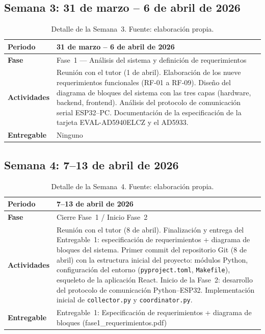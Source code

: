 \documentclass[11pt,a4paper,spanish]{book}
\begin{document}
\subsection{Semana 3: 31 de marzo -- 6 de abril de 2026}

\begin{table}[ht]
\centering
\begin{tabular}{p{3cm} p{10cm}}
\hline\hline
\textbf{Periodo} & 31 de marzo -- 6 de abril de 2026 \\ [0.5ex]
\hline
\textbf{Fase} & Fase~1 --- An\'{a}lisis del sistema y definici\'{o}n de requerimientos \\ \hline
\textbf{Actividades} & Reuni\'{o}n con el tutor (1 de abril). Elaboraci\'{o}n de los nueve requerimientos funcionales (RF-01 a RF-09). Dise\~{n}o del diagrama de bloques del sistema con las tres capas (hardware, backend, frontend). An\'{a}lisis del protocolo de comunicaci\'{o}n serial ESP32--PC. Documentaci\'{o}n de la especificaci\'{o}n de la tarjeta EVAL-AD5940ELCZ y el AD5933. \\ \hline
\textbf{Entregable} & Ninguno \\ \hline
\end{tabular}
\caption[Semana 3]{Detalle de la Semana~3. Fuente: elaboraci\'{o}n propia.}
\label{tab:semana3}
\end{table}

\subsection{Semana 4: 7--13 de abril de 2026}

\begin{table}[ht]
\centering
\begin{tabular}{p{3cm} p{10cm}}
\hline\hline
\textbf{Periodo} & 7--13 de abril de 2026 \\ [0.5ex]
\hline
\textbf{Fase} & Cierre Fase~1 / Inicio Fase~2 \\ \hline
\textbf{Actividades} & Reuni\'{o}n con el tutor (8 de abril). Finalizaci\'{o}n y entrega del Entregable~1: especificaci\'{o}n de requerimientos + diagrama de bloques del sistema. Primer commit del repositorio Git (8 de abril) con la estructura inicial del proyecto: m\'{o}dulos Python, configuraci\'{o}n del entorno (\texttt{pyproject.toml}, \texttt{Makefile}), esqueleto de la aplicaci\'{o}n React. Inicio de la Fase~2: desarrollo del protocolo de comunicaci\'{o}n Python--ESP32. Implementaci\'{o}n inicial de \texttt{collector.py} y \texttt{coordinator.py}. \\ \hline
\textbf{Entregable} & Entregable~1: Especificaci\'{o}n de requerimientos + diagrama de bloques (fase1\_requerimientos.pdf) \\ \hline
\end{tabular}
\caption[Semana 4]{Detalle de la Semana~4. Fuente: elaboraci\'{o}n propia.}
\label{tab:semana4}
\end{table}
\end{document}
